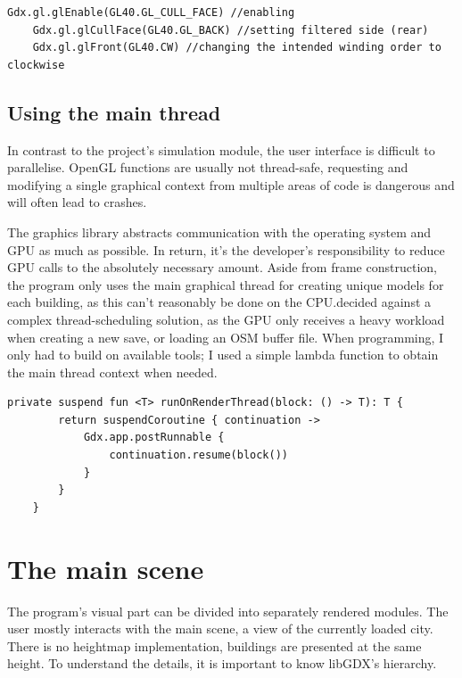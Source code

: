 \begin{lstlisting}[caption=Example for changing OpenGL's culling properties through libGDX]
    Gdx.gl.glEnable(GL40.GL_CULL_FACE) //enabling
    Gdx.gl.glCullFace(GL40.GL_BACK) //setting filtered side (rear)
    Gdx.gl.glFront(GL40.CW) //changing the intended winding order to clockwise
\end{lstlisting}

\subsection{Using the main thread}

In contrast to the project's simulation module, the user interface is difficult to parallelise. OpenGL functions are usually not thread-safe, requesting and modifying a single graphical context from multiple areas of code is dangerous and will often lead to crashes.

The graphics library abstracts communication with the operating system and GPU as much as possible. In return, it's the developer's responsibility to reduce GPU calls to the absolutely necessary amount. Aside from frame construction, the program only uses the main graphical thread for creating unique models for each building, as this can't reasonably be done on the CPU.\@I decided against a complex thread-scheduling solution, as the GPU only receives a heavy workload when creating a new save, or loading an OSM buffer file. When programming, I only had to build on available tools; I used a simple lambda function to obtain the main thread context when needed.

\begin{lstlisting}[caption=Helper function for getting the draw thread]
private suspend fun <T> runOnRenderThread(block: () -> T): T {
        return suspendCoroutine { continuation ->
            Gdx.app.postRunnable {
                continuation.resume(block())
            }
        }
    }
\end{lstlisting}


\section{The main scene}
The program's visual part can be divided into separately rendered modules. The user mostly interacts with the main scene, a view of the currently loaded city. There is no heightmap implementation, buildings are presented at the same height. To understand the details, it is important to know libGDX's hierarchy.\cite{LibgdxModels}


